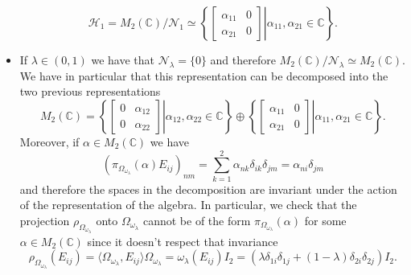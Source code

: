 \begin{example}
\begin{itemize}
\begin{equation}
\mathcal{H}_1=M_2(\mathbb{C})/\mathcal{N}_1\simeq\left\{\left.\begin{bmatrix}
\alpha_{11} & 0 \\
\alpha_{21} & 0
\end{bmatrix}\right|\alpha_{11},\alpha_{21}\in\mathbb{C}\right\}.
\end{equation}
\item If $\lambda \in(0,1)$ we have that $\mathcal{N}_\lambda = \{0\}$ and therefore $M_2(\mathbb{C})/\mathcal{N}_\lambda \simeq M_2(\mathbb{C})$. We have in particular that this representation can be decomposed into the two previous representations
\begin{equation}
M_2(\mathbb{C})=\left\{\left.\begin{bmatrix}
0 & \alpha_{12} \\
0 & \alpha_{22}
\end{bmatrix}\right|\alpha_{12},\alpha_{22}\in\mathbb{C}\right\}\oplus\left\{\left.\begin{bmatrix}
\alpha_{11} & 0 \\
\alpha_{21} & 0
\end{bmatrix}\right|\alpha_{11},\alpha_{21}\in\mathbb{C}\right\}.
\end{equation} 
Moreover, if $\alpha \in M_2(\mathbb{C})$ we have
\begin{equation}
(\pi_{\Omega_{\omega_\lambda}}(\alpha)E_{ij})_{nm}=\sum_{k=1}^2\alpha_{nk}\delta_{ik}\delta_{jm}=\alpha_{ni}\delta_{jm}
\end{equation}
and therefore the spaces in the decomposition are invariant under the action of the representation of the algebra. In particular, we check that the projection $\rho_{\Omega_{\omega_\lambda}}$ onto $\Omega_{\omega_\lambda}$ cannot be of the form $\pi_{\Omega_{\omega_\lambda}}(\alpha)$ for some $\alpha\in M_2(\mathbb{C})$ since it doesn't respect that invariance
\begin{equation}
\rho_{\Omega_{\omega_\lambda}}(E_{ij})=\langle \Omega_{\omega_\lambda}, E_{ij}\rangle\Omega_{\omega_\lambda} = \omega_\lambda(E_{ij})I_2=(\lambda\delta_{1i}\delta_{1j}+(1-\lambda)\delta_{2i}\delta_{2j})I_2.
\end{equation} 
\end{itemize}
\end{example}

